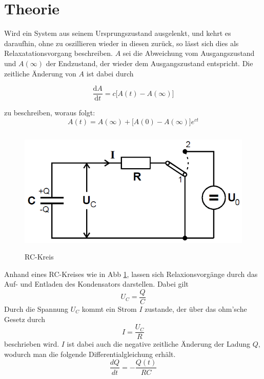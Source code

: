 \section{Theorie}
\label{sec:Theorie}

Wird ein System aus seinem Ursprungszustand ausgelenkt, und kehrt es daraufhin, ohne zu oszillieren 
wieder in diesen zurück, so lässt sich dies als Relaxatationsvorgang beschreiben.
$A$ sei die Abweichung vom Ausgangszustand und $A(\infty)$ der Endzustand, der wieder dem Ausgangszustand
entspricht. Die zeitliche Änderung von $A$ ist dabei durch

\begin{equation}
    \label{eqn:dA}
    \frac{\text{d}A}{\text{d}t} = c\biggl[ A(t) - A(\infty) \biggr]
\end{equation}

zu beschreiben, woraus folgt: 
\begin{equation}
    \label{eqn:avont}
    A(t) = A(\infty) + \bigl[A(0) - A(\infty)]e^{ct}
\end{equation}

\FloatBarrier
\begin{figure}
    \centering
    \includegraphics[height=6cm]{data/bild_1}
    \caption{RC-Kreis}
    \label{fig:bild_1}
\end{figure}
Anhand eines RC-Kreises wie in Abb \ref{fig:bild_1}, lassen sich Relaxionsvorgänge durch das Auf- und Entladen des Kondensators
darstellen. Dabei gilt 
\begin{equation}
    U_C = \frac{Q}C   
\end{equation}
Durch die Spannung $U_C$ kommt ein Strom $I$ zustande, der über das ohm'sche Gesetz durch
\begin{equation}
    I = \frac{U_C}R 
\end{equation}
beschrieben wird. $I$ ist dabei auch die negative zeitliche Änderung der Ladung $Q$, wodurch man die folgende 
Differentialgleichung erhält.
\begin{equation}
    \frac{dQ}{dt} = -\frac{Q(t)}{RC}    
\end{equation}

